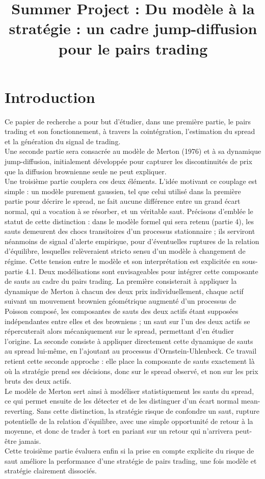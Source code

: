 \documentclass{article}
\date{}
\title{Summer Project : Du modèle à la stratégie : un cadre jump-diffusion pour le pairs trading}
\begin{document}
\maketitle

\section{Introduction}
\indent Ce papier de recherche a pour but d'étudier, dans une première partie, le pairs trading et son fonctionnement, à travers la cointégration, l'estimation du spread et la génération du signal de trading. \\
Une seconde partie sera consacrée au modèle de Merton (1976) et à sa dynamique jump-diffusion, initialement développée pour capturer les discontinuités de prix que la diffusion brownienne seule ne peut expliquer. \\
Une troisième partie couplera ces deux éléments. L'idée motivant ce couplage est simple : un modèle purement gaussien, tel que celui utilisé dans la première partie pour décrire le spread, ne fait aucune différence entre un grand écart normal, qui a vocation à se résorber, et un véritable saut. Précisons d'emblée le statut de cette distinction : dans le modèle formel qui sera retenu (partie 4), les sauts demeurent des chocs transitoires d'un processus stationnaire ; ils serviront néanmoins de signal d'alerte empirique, pour d'éventuelles ruptures de la relation d'équilibre, lesquelles relèveraient stricto sensu d'un modèle à changement de régime. Cette tension entre le modèle et son interprétation est explicitée en sous-partie 4.1. Deux modélisations sont envisageables pour intégrer cette composante de sauts au cadre du pairs trading. La première consisterait à appliquer la dynamique de Merton à chacun des deux prix individuellement, chaque actif suivant un mouvement brownien géométrique augmenté d'un processus de Poisson composé, les composantes de sauts des deux actifs étant supposées indépendantes entre elles et des browniens ; un saut sur l'un des deux actifs se répercuterait alors mécaniquement sur le spread, permettant d'en étudier l'origine. La seconde consiste à appliquer directement cette dynamique de sauts au spread lui-même, en l'ajoutant au processus d'Ornstein-Uhlenbeck. Ce travail retient cette seconde approche : elle place la composante de sauts exactement là où la stratégie prend ses décisions, donc sur le spread observé, et non sur les prix bruts des deux actifs. \\
Le modèle de Merton sert ainsi à modéliser statistiquement les sauts du spread, ce qui permet ensuite de les détecter et de les distinguer d'un écart normal mean-reverting. Sans cette distinction, la stratégie risque de confondre un saut, rupture potentielle de la relation d'équilibre, avec une simple opportunité de retour à la moyenne, et donc de trader à tort en pariant sur un retour qui n'arrivera peut-être jamais. \\
Cette troisième partie évaluera enfin si la prise en compte explicite du risque de saut améliore la performance d'une stratégie de pairs trading, une fois modèle et stratégie clairement dissociés.
\end{document}
